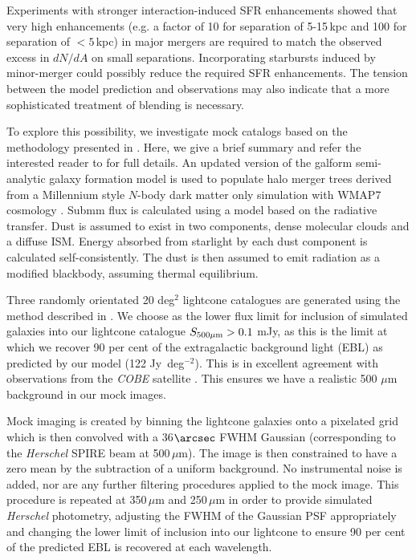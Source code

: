 \documentclass[iop]{emulateapj}
\begin{document}
Experiments with stronger interaction-induced SFR enhancements showed that very
high enhancements (e.g. a factor of 10 for separation of 5-15$\,$kpc and 100 for
separation of $<5\,$kpc) in major mergers are required to match the observed
excess in $dN/dA$ on small separations. Incorporating starbursts induced by
minor-merger could possibly reduce the required SFR enhancements. The tension
between the model prediction and observations may also indicate that a more
sophisticated treatment of blending is necessary.

To explore this possibility, we investigate mock catalogs based on the
methodology presented in \citet{Cowley:2015lr}.  Here, we give a brief summary
and refer the interested reader to \citet{Cowley:2015lr} for full details. An
updated version of the {\sc galform} \citep[e.g.][Lacey et al. in
preparation]{Cole:2000fk} semi-analytic galaxy formation model is used to
populate halo merger trees \citep[e.g.][]{Parkinson:2008qy, Jiang:2014lr}
derived from a Millennium style $N$-body dark matter only simulation
\citep{Springel:2005lr, Guo:2013lr} with WMAP7 cosmology
\citep{Komatsu:2011fk}.  Submm flux is calculated using a model based on the
radiative transfer.  Dust is assumed to exist in two components,  dense
molecular clouds and a diffuse ISM.  Energy absorbed from starlight by each
dust component is calculated self-consistently.  The dust is then assumed to
emit radiation as a modified blackbody, assuming thermal equilibrium.  

Three randomly orientated 20 deg$^2$ lightcone catalogues are generated using
the method described in \citet{Merson:2013lr}.  We choose as the lower flux
limit for inclusion of simulated galaxies into our lightcone catalogue
$S_{500\mu\rm{m}}>0.1$ mJy, as this is the limit at which we recover 90 per
cent of the extragalactic background light (EBL) as predicted by our model (122
Jy~deg$^{-2}$). This is in excellent agreement with observations from the
\emph{COBE} satellite \citep[e.g.,][]{Puget:1996lr}. This ensures we have a
realistic 500 $\mu$m  background in our mock images.  

Mock imaging is created by binning the lightcone galaxies onto a pixelated grid
which is then convolved with a 36$\arcsec$ FWHM Gaussian (corresponding to the
\emph{Herschel} SPIRE beam at 500$\,\mu$m).  The image is then constrained to
have a zero mean by the subtraction of a uniform background.  No instrumental
noise is added, nor are any further filtering procedures applied to the mock
image.  This procedure is repeated at 350$\,\mu$m and 250$\,\mu$m in order to
provide simulated \emph{Herschel} photometry, adjusting the FWHM of the
Gaussian PSF appropriately and changing the lower limit of inclusion into our
lightcone to ensure 90 per cent of the predicted EBL is recovered at each
wavelength.    
\end{document}
